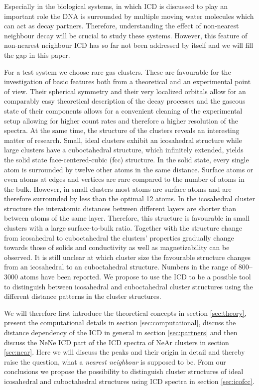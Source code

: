 Especially in the biological systems, in which ICD is discussed to play an
important role \cite{Alizadeh15,Gokhberg14,Trinter14}
the DNA is surrounded by multiple moving
water molecules which can act as decay partners. Therefore, understanding the
effect of non-nearest neighbour decay will be crucial to study these systems.
However, this feature of non-nearest neighbour ICD
has so far not been addressed by itself and we will fill the gap in this
paper.

For a test system we choose rare gas clusters. These are favourable
for the investigation of basic features both
from a theoretical and an experimental point of view. Their spherical
symmetry and their very localized orbitals allow for an comparably easy
theoretical description of the decay processes and the gaseous state
of their components allows for a convenient cleaning of the experimental
setup allowing for higher count rates and therefore a higher resolution
of the spectra. At the same time, the structure of the clusters reveals an
interesting matter of research. Small, ideal clusters exhibit an icosahedral
structure while large clusters have a cuboctahedral structure, which
infinitely extended, yields the solid state face-centered-cubic (fcc) structure.
In the solid state, every single atom is surrounded by twelve other atoms in the
same distance. Surface atoms or even atoms at edges and vertices are rare
compared to the number of atoms in the bulk. 
However, in small clusters most atoms are surface atoms and are therefore
surrounded by less than the optimal 12 atoms.
In the icosahedral cluster structure the interatomic distances between different
layers are shorter than between atoms of the same layer. 
Therefore,
this structure is favourable in small clusters with a large surface-to-bulk ratio.
Together with the structure change from icosahedral to cuboctahedral
the clusters' properties gradually change towards those of solids and
conductivity as well as magnetizability can be observed. \cite{Benfield92}
It is still unclear at which cluster size the favourable structure changes from
an icosahedral to an cuboctahedral structure. Numbers in the range
of 800--3000 atoms have been reported. \cite{Hartke02,Pahl08}
We propose to use the ICD to be a possible tool to distinguish between
icosahedral and cuboctahedral cluster structures using the different distance
patterns in the cluster structures.

We will
therefore first introduce the theoretical concepts in section \ref{sec:theory},
present the computational details in section \ref{sec:computational},
discuss the distance dependency of the ICD in general
in section \ref{sec:partners} and then
discuss the NeNe ICD part of the ICD spectra of NeAr clusters
\cite{Fasshauer14_1} in section \ref{sec:near}. Here we will discuss the
peaks and their origin in detail and thereby
raise the question, what a \emph{nearest neighbour} is supposed to be. From
our conclusions we propose the possibility to distinguish cluster structures
of ideal icosahedral and cuboctahedral structures using ICD spectra in
section \ref{sec:icofcc}.

